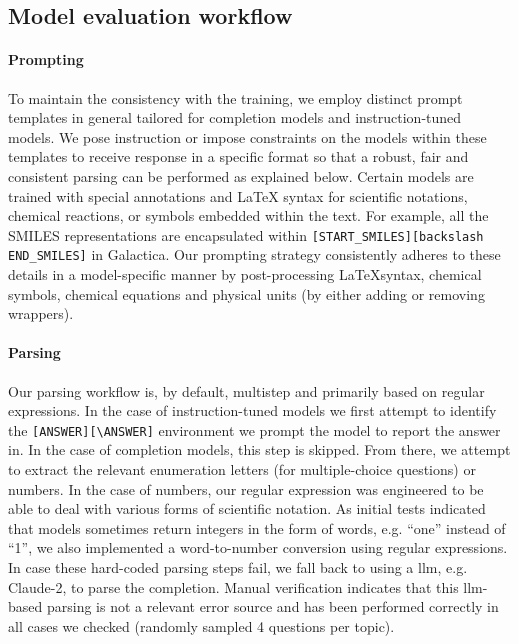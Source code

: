\documentclass[11pt, oneside]{article}
\begin{document}
\begin{refsection}
\subsection{Model evaluation workflow}

\paragraph{Prompting}

To maintain the consistency with the training, we employ distinct prompt templates in general tailored for completion models and instruction-tuned models. 
We pose instruction or impose constraints on the models within these templates to receive response in a specific format so that a robust, fair and consistent parsing can be performed as explained below.
Certain models are trained with special annotations and LaTeX syntax for scientific notations, chemical reactions, or symbols embedded within the text. 
For example, all the SMILES representations are encapsulated within \texttt{[START\_SMILES][\text backslash END\_SMILES]} in Galactica\autocite{taylor2022galactica}.
Our prompting strategy consistently adheres to  these details in a model-specific manner by post-processing \LaTeX syntax, chemical symbols, chemical equations and physical units (by either adding or removing wrappers).



\paragraph{Parsing}
Our parsing workflow is, by default, multistep and primarily based on regular expressions.
In the case of instruction-tuned models we first attempt to identify the \texttt{[ANSWER][\textbackslash ANSWER]} environment we prompt the model to report the answer in.
In the case of completion models, this step is skipped. From there, we attempt to extract the relevant enumeration letters (for multiple-choice questions) or numbers.
In the case of numbers, our regular expression was engineered to be able to deal with various forms of scientific notation.
As initial tests indicated that models sometimes return integers in the form of words, e.g. \enquote{one} instead of \enquote{1}, we also implemented a word-to-number conversion using regular expressions.
In case these hard-coded parsing steps fail, we fall back to using a \gls{llm}, e.g. Claude-2, to parse the completion.
Manual verification indicates that this \gls{llm}-based parsing is not a relevant error source and has been performed correctly in all cases we checked (randomly sampled 4 questions per topic).


\end{refsection}
\end{document}
